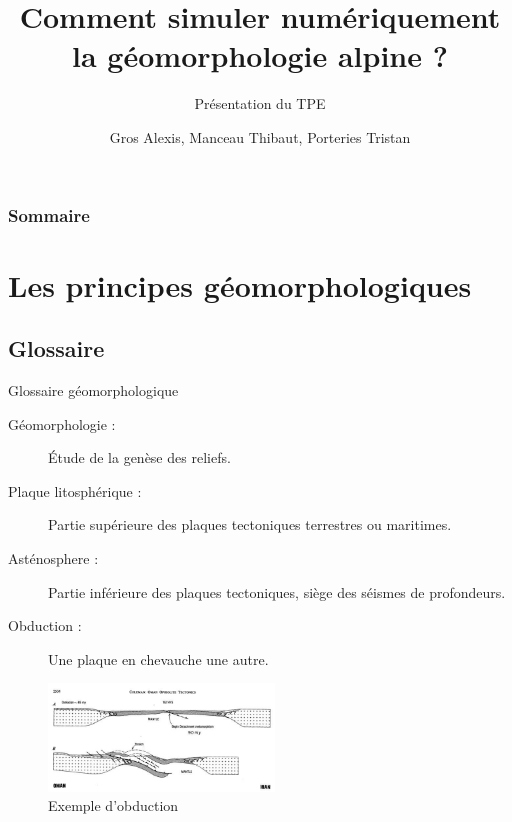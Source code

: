 \documentclass{beamer}
\title{Comment simuler numériquement la géomorphologie alpine ?}
\subtitle{Présentation du TPE}
\author{Gros Alexis, Manceau Thibaut, Porteries Tristan}
\begin{document}
\frame{\titlepage}

\begin{frame}
    \frametitle{Sommaire}
    \begin{multicols}{2}
      {
		\setcounter{tocdepth}{1}
        \tableofcontents
      }
    \end{multicols}
\end{frame}

\section{Les principes géomorphologiques}

\subsection{Glossaire}
\begin{frame}{Glossaire géomorphologique}
  \begin{description}
    \item[Géomorphologie :] Étude de la genèse des reliefs.
    \item[Plaque litosphérique :] Partie supérieure des plaques tectoniques terrestres ou maritimes.
    \item[Asténosphere :] Partie inférieure des plaques tectoniques, siège des séismes de profondeurs.
    \item[Obduction :] Une plaque en chevauche une autre.
  \end{description}
  \begin{center}
    \begin{figure}
      \includegraphics[width=6cm]{Images/Images_Alexis/image007.jpg}
      \caption{Exemple d'obduction}
    \end{figure}
  \end{center}
\end{frame}
\end{document}
